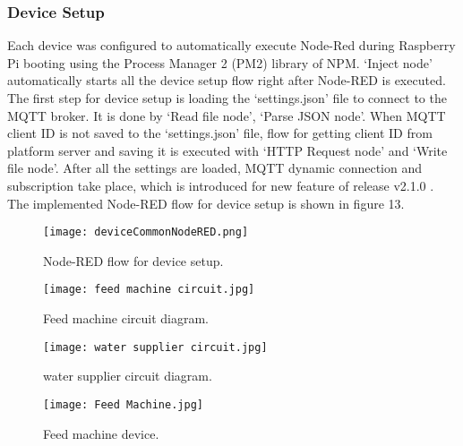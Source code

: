 \documentclass[conference]{IEEEtran}
\begin{document}
\subsubsection{Device Setup}
Each device was configured to automatically execute Node-Red during Raspberry Pi booting using the Process Manager 2 (PM2) library of NPM. ‘Inject node’ automatically starts all the device setup flow right after Node-RED is executed. The first step for device setup is loading the ‘settings.json’ file to connect to the MQTT broker. It is done by ‘Read file node’, ‘Parse JSON node’. When MQTT client ID is not saved to the ‘settings.json’ file, flow for getting client ID from platform server and saving it is executed with ‘HTTP Request node’ and ‘Write file node’. After all the settings are loaded, MQTT dynamic connection and subscription take place, which is introduced for new feature of release v2.1.0 \cite{b26}. The implemented Node-RED flow for device setup is shown in figure 13.

\begin{figure}[htbp]
\centerline{\texttt{[image: deviceCommonNodeRED.png]}}
\caption{Node-RED flow for device setup.}
\label{fig}
\end{figure}

\begin{figure}[htbp]
\centerline{\texttt{[image: feed machine circuit.jpg]}}
\caption{Feed machine circuit diagram.}
\label{fig}
\end{figure}

\begin{figure}[htbp]
\centerline{\texttt{[image: water supplier circuit.jpg]}}
\caption{water supplier circuit diagram.}
\label{fig}
\end{figure}

\begin{figure}[htbp]
\centerline{\texttt{[image: Feed Machine.jpg]}}
\caption{Feed machine device.}
\label{fig}
\end{figure}
\end{document}
